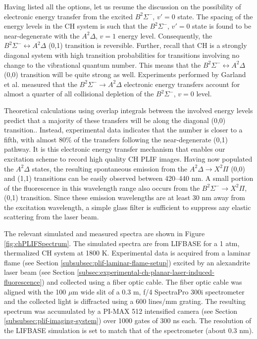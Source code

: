Having listed all the options, let us resume the discussion on the possibility of electronic energy transfer from the excited \(B^2\Sigma^-\), \(v'=0\) state.
The spacing of the energy levels in the CH system is such that the \(B^2\Sigma^-\), \(v'=0\) state is found to be near-degenerate with the \(A^2\Delta\), \(v=1\) energy level.
Consequently, the \(B^2\Sigma^-\leftrightarrow A^2\Delta\) (0,1) transition is reversible.
Further, recall that CH is a strongly diagonal system with high transition probabilities for transitions involving no change to the vibrational quantum number.
This means that the \(B^2\Sigma^-\leftrightarrow A^2\Delta\) (0,0) transition will be quite strong as well.
Experiments performed by Garland et al.\cite{1985-garland-b} measured that the \(B^2\Sigma^-\rightarrow A^2\Delta\) electronic energy transfers account for almost a quarter of all collisional depletion of the \(B^2\Sigma^-\), \(v=0\) level.

Theoretical calculations using overlap integrals between the involved energy levels predict that a majority of these transfers will be along the diagonal (0,0) transition.\cite{2000-luque}.
Instead, experimental data indicates that the number is closer to a fifth, with almost 80\% of the transfers following the near-degenerate (0,1) pathway.
It is this electronic energy transfer mechanism that enables our excitation scheme to record high quality CH PLIF images.
Having now populated the \(A^2\Delta\) states, the resulting spontaneous emission from the \(A^2\Delta\rightarrow X^2\Pi\) (0,0) and (1,1) transitions can be easily observed between 420--440 nm.
A small portion of the fluorescence in this wavelength range also occurs from the \(B^2\Sigma^-\rightarrow X^2\Pi\), (0,1) transition.
Since these emission wavelengths are at least 30 nm away from the excitation wavelength, a simple glass filter is sufficient to suppress any elastic scattering from the laser beam.



The relevant simulated and measured spectra are shown in Figure \ref{fig:chPLIFSpectrum}.
The simulated spectra are from LIFBASE for a 1 atm, thermalized CH system at 1800 K.
Experimental data is acquired from a laminar flame (see Section \ref{subsubsec:plif-laminar-flame-setup}) excited by an alexandrite laser beam (see Section \ref{subsec:experimental-ch-planar-laser-induced-fluorescence}) and collected using a fiber optic cable.
The fiber optic cable was aligned with the 100 \(\mu\)m wide slit of a 0.3 m, f/4 SpectraPro 300i spectrometer and the collected light is diffracted using a 600 lines/mm grating.
The resulting spectrum was accumulated by a PI-MAX 512 intensified camera (see Section \ref{subsubsec:plif-imaging-system}) over 1000 gates of 300 ns each.
The resolution of the LIFBASE simulation is set to match that of the spectrometer (about 0.3 nm).

